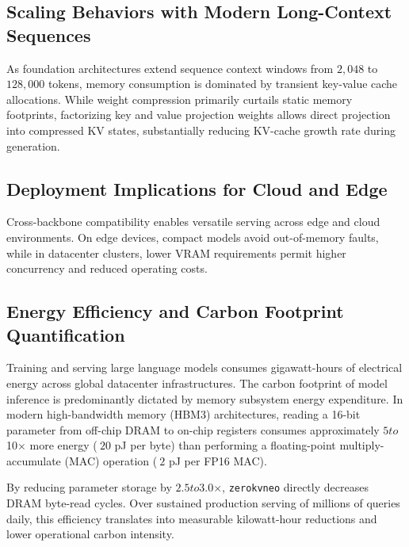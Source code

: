 \subsection{Scaling Behaviors with Modern Long-Context Sequences}
As foundation architectures extend sequence context windows from $2{,}048$ to $128{,}000$ tokens, memory consumption is dominated by transient key-value cache allocations. While weight compression primarily curtails static memory footprints, factorizing key and value projection weights allows direct projection into compressed KV states, substantially reducing KV-cache growth rate during generation.

\subsection{Deployment Implications for Cloud and Edge}
Cross-backbone compatibility enables versatile serving across edge and cloud environments. On edge devices, compact models avoid out-of-memory faults, while in datacenter clusters, lower VRAM requirements permit higher concurrency and reduced operating costs.

\subsection{Energy Efficiency and Carbon Footprint Quantification}
Training and serving large language models consumes gigawatt-hours of electrical energy across global datacenter infrastructures. The carbon footprint of model inference is predominantly dictated by memory subsystem energy expenditure. In modern high-bandwidth memory (HBM3) architectures, reading a 16-bit parameter from off-chip DRAM to on-chip registers consumes approximately $5$\times$ to $10$\times$ more energy ($~20$ pJ per byte) than performing a floating-point multiply-accumulate (MAC) operation ($~2$ pJ per FP16 MAC).

By reducing parameter storage by $2.5$\times$ to $3.0$\times$, \texttt{zerokvneo} directly decreases DRAM byte-read cycles. Over sustained production serving of millions of queries daily, this efficiency translates into measurable kilowatt-hour reductions and lower operational carbon intensity.
